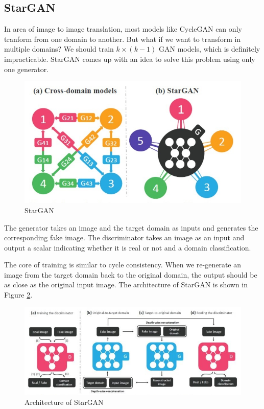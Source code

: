 \documentclass{article} %
\begin{document}
\subsection{StarGAN}

In area of image to image translation, most models like CycleGAN can only tranform from one domain to another. But what if we want to transform in multiple domains? We should train $k \times (k-1)$ GAN models, which is definitely impracticable. StarGAN comes up with an idea to solve this problem using only one generator.

\begin{figure}[h]
	\centering
	\includegraphics[width=0.75\linewidth]{figures/StarGAN_1.jpg}
	\caption{StarGAN}
	\label{fig:StarGAN_1}
\end{figure}

The generator takes an image and the target domain as inputs and generates the corresponding fake image. The discriminator takes an image as an input and output a scalar indicating whether it is real or not and a domain classification. 

The core of training is similar to cycle consistency. When we re-generate an image from the target domain back to the original domain, the output should be as close as the original input image. The architecture of StarGAN is shown in Figure \ref{fig:StarGAN_2}.

\begin{figure}[h]
	\centering
	\includegraphics[width=0.95\linewidth]{figures/stargan_2.jpg}
	\caption{Architecture of StarGAN}
	\label{fig:StarGAN_2}
\end{figure}
\end{document}
